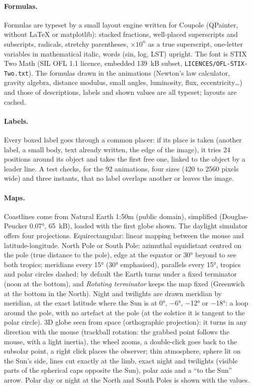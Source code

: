 \paragraph{Formulas.} Formulas are typeset by a small layout engine written for Coupole (QPainter, without \LaTeX{}
or matplotlib): stacked fractions, well-placed superscripts and subscripts, radicals, stretchy parentheses,
$\times 10^n$ as a true superscript, one-letter variables in mathematical italic, words (sin, log, LST) upright. The
font is STIX Two Math (SIL OFL 1.1 licence, embedded 139~kB subset, \texttt{LICENCES/OFL-STIX-Two.txt}). The formulas
drawn in the animations (Newton's law calculator, gravity algebra, distance modulus, small angles, luminosity, flux,
eccentricity…) and those of descriptions, labels and shown values are all typeset; layouts are cached.

\paragraph{Labels.} Every boxed label goes through a common placer: if its place is taken (another label, a small
body, text already written, the edge of the image), it tries 24 positions around its object and takes the first free
one, linked to the object by a leader line. A test checks, for the 92 animations, four sizes (420 to 2560 pixels
wide) and three instants, that no label overlaps another or leaves the image.

\paragraph{Maps.} Coastlines come from Natural Earth 1:50m (public domain), simplified (Douglas-Peucker 0.07°, 65~kB),
loaded with the first globe shown. The daylight simulator offers four projections. Equirectangular: linear mapping
between the mouse and latitude-longitude. North Pole or South Pole: azimuthal equidistant centred on the pole (true
distance to the pole), edge at the equator or 30° beyond to see both tropics; meridians every 15° (30° emphasised),
parallels every 15°, tropics and polar circles dashed; by default the Earth turns under a fixed terminator (noon at
the bottom), and \emph{Rotating terminator} keeps the map fixed (Greenwich at the bottom in the North). Night and
twilights are drawn meridian by meridian, at the exact latitude where the Sun is at 0°, −6°, −12° or −18°: a loop
around the pole, with no artefact at the pole (at the solstice it is tangent to the polar circle). 3D globe seen from
space (orthographic projection): it turns in any direction with the mouse (trackball rotation: the grabbed point
follows the mouse, with a light inertia), the wheel zooms, a double-click goes back to the subsolar point, a right
click places the observer; thin atmosphere, sphere lit on the Sun's side, lines cut exactly at the limb, exact night
and twilights (visible parts of the spherical caps opposite the Sun), polar axis and a “to the Sun” arrow. Polar day
or night at the North and South Poles is shown with the values.

